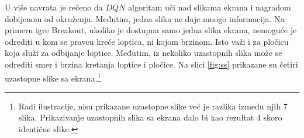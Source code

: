 \par 
U više navrata je rečeno da $DQN$ algoritam uči nad slikama ekrana i nagradom dobijenom od okruženja. Međutim, jedna slika ne daje mnogo informacija. Na primeru igre Breakout, ukoliko je dostupna samo jedna slika ekrana, nemoguće je odrediti u kom se pravcu kreće loptica, ni kojom brzinom. Isto važi i za pločicu koja služi za odbijanje loptice. Međutim, iz nekoliko uzastopnih slika može se odrediti smer i brzina kretanja loptice i pločice. Na slici \ref{fig:ss} prikazane su četiri uzastopne slike sa ekrana.\footnote{Radi ilustracije, nisu prikazane uzastopne slike već je razlika između njih 7 slika. Prikazivanje uzastopnih slika sa ekrana dalo bi kao rezultat 4 skoro identične slike.} 

\begin{figure}
	\centering

\end{figure}
